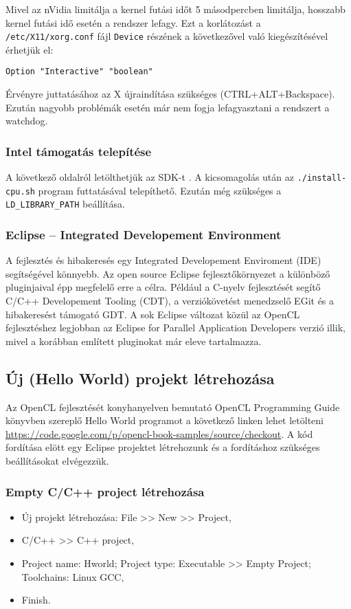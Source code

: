 	Mivel az nVidia limitálja a kernel futási időt 5 másodpercben limitálja,
	hosszabb kernel futási idő esetén a rendszer lefagy.
	Ezt a korlátozást a \texttt{/etc/X11/xorg.conf} fájl \texttt{Device} részének a
	következővel való kiegészítésével érhetjük el:
\begin{lstlisting}
Option "Interactive" "boolean"
\end{lstlisting}
	Érvényre juttatásához az X újraindítása szükséges (CTRL+ALT+Backspace).
	Ezután nagyobb problémák esetén már nem fogja lefagyasztani a rendszert a
	watchdog.

\subsubsection*{Intel támogatás telepítése}
	A következő oldalról letölthetjük az SDK-t \cite{intel-sdk}.
	A kicsomagolás után az \texttt{./install-cpu.sh} program futtatásával
	telepíthető.
	Ezután még szükséges a \texttt{LD\_LIBRARY\_PATH} beállítása.

\subsubsection*{Eclipse – Integrated Developement Environment}
	A fejlesztés és hibakeresés egy Integrated Developement Enviroment (IDE) segítségével könnyebb.
	Az open source Eclipse \cite{eclipse} fejlesztőkörnyezet a különböző pluginjaival épp megfelelő erre a célra.
	Például a C-nyelv fejlesztését segítő C/C++ Developement Tooling (CDT), a verziókövetést menedzselő EGit és a hibakeresést támogató GDT.
	A sok Eclipse változat közül az OpenCL fejlesztéshez legjobban az
	Eclipse for Parallel Application Developers verzió illik, mivel a korábban említett pluginokat már eleve tartalmazza.

\subsection*{Új (Hello World) projekt létrehozása}
	Az OpenCL fejlesztését konyhanyelven bemutató OpenCL Programming Guide \cite{Munshi2011}
	könyvben szereplő Hello World programot a következő linken lehet letölteni
	\url{https://code.google.com/p/opencl-book-samples/source/checkout}.
	A kód fordítása elött egy Eclipse projektet létrehozunk és a fordításhoz szükséges beállításokat elvégezzük.
	
\subsubsection*{Empty C/C++ project létrehozása}
	\begin{itemize}[noitemsep]
		\item Új projekt létrehozása: File >> New >> Project,
		\item C/C++ >> C++ project,
		\item Project name: Hworld; Project type: Executable >> Empty Project; Toolchains: Linux GCC,
		\item Finish.
	\end{itemize}
	

